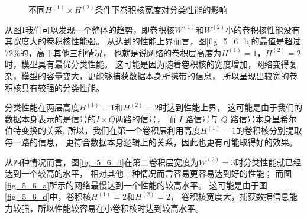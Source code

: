 \begin{figure}[!h]
{		\label{fig_5_6_c}}
	\caption{不同$H^{(1)} \times H^{(2)}$条件下卷积核宽度对分类性能的影响}
	\label{fig_5_6}
\end{figure}

从图\ref{fig_5_6}我们可以发现一个整体的趋势，即卷积核$W^{(1)}$和$W^{(2)}$小的卷积核性能没有其宽度大的卷积核性能强。
从达到的性能上界而言，图\ref{fig_5_6_b}的最值是超过$72\%$的，高于其他三种情况，
也就是说网络的卷积层高度为$H^{(1)} = 1$，$H^{(2)} = 2$时，模型具有最优分类性能。
这可能是因为随着卷积核的宽度增加，网络变得复杂，模型的容量变大，更能够捕获数据本身所携带的信息，
所以呈现出较宽的卷积核具有较强的分类性能。\par

分类性能在两层高度$H^{(1)}=1$和$H^{(2)}=2$时达到性能上界，
这可能是由于我们的数据本身表示的是信号的$I \times Q$两路的信号，
而 $I$ 路信号与 $Q$ 路信号本身呈希尔伯特变换的关系,
所以，我们在第一个卷积层利用高度$H^{(1)}=1$的卷积核分别提取每一路的信息，
更符合数据本身逻辑上的关系，因此也更有可能取得好的效果。
\par

从四种情况而言，图\ref{fig_5_6_d}在第二卷积层宽度为$W^{(2)}=3$时分类性能就已经达到一个较高的水平，
相对其他三种情况而言容易更容易达到好的性能；
而图\ref{fig_5_6_a}所示的网络最慢达到一个性能的较高水平。
这可能是由于图\ref{fig_5_6_d}中，卷积核$H^{(1)}=2$和$H^{(2)}=2$，
卷积核宽度大，捕获数据信息能力较强，所以性能较容易在小卷积核时达到较高水平。\par

